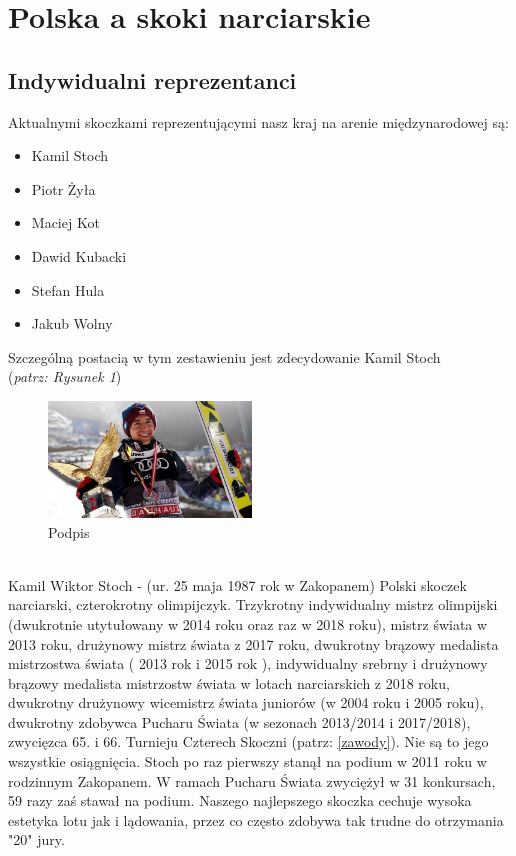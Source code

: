 \documentclass[11pt]{article}
\begin{document}
\section{Polska a skoki narciarskie}
\subsection{Indywidualni reprezentanci}
Aktualnymi skoczkami reprezentującymi nasz kraj na arenie międzynarodowej są:
\begin{itemize}
\item Kamil Stoch
\item Piotr Żyła
\item Maciej Kot
\item Dawid Kubacki
\item Stefan Hula
\item Jakub Wolny
\end{itemize}
\newpage
\noindent
Szczególną postacią w tym zestawieniu jest zdecydowanie Kamil Stoch\\(\textit{\small patrz: Rysunek 1})\label{kamil_stoch}
\begin{figure}
\begin{flushleft}
\includegraphics[angle=45,width=0.48\textwidth]{Kamil.jpg}
\end{flushleft}
\caption{Podpis}
\label{Etykieta}
\end{figure}
\\
Kamil Wiktor Stoch - (ur. 25 maja 1987 rok w Zakopanem) Polski skoczek narciarski, czterokrotny olimpijczyk. Trzykrotny indywidualny mistrz olimpijski (dwukrotnie utytułowany w 2014 roku oraz raz w 2018 roku), mistrz świata w 2013 roku, drużynowy mistrz świata z 2017 roku, dwukrotny brązowy medalista mistrzostwa świata ( 2013 rok i 2015 rok ), indywidualny srebrny i drużynowy brązowy medalista mistrzostw świata w lotach narciarskich z 2018 roku, dwukrotny drużynowy wicemistrz świata juniorów (w 2004 roku i 2005 roku), dwukrotny zdobywca Pucharu Świata (w sezonach 2013/2014 i 2017/2018), zwycięzca 65. i 66. Turnieju Czterech Skoczni (patrz: \ref{zawody}).
Nie są to jego wszystkie osiągnięcia. Stoch po raz pierwszy stanął na podium w 2011 roku w rodzinnym Zakopanem. W ramach Pucharu Świata zwyciężył w 31 konkursach, 59 razy zaś stawał na podium. Naszego najlepszego skoczka cechuje wysoka estetyka lotu jak i lądowania, przez co często zdobywa tak trudne do otrzymania "20" jury.
\end{document}
